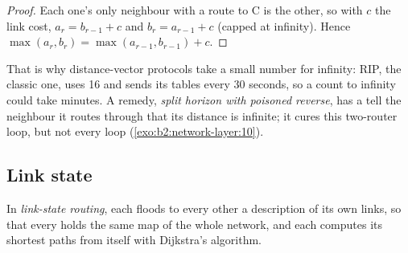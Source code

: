 \begin{proof}
Each one's only neighbour with a route to C is the other, so with $c$ the link cost, $a_{r} = b_{r-1} + c$ and $b_r =
a_{r-1} + c$ (capped at infinity). Hence $\max(a_r, b_r) = \max(a_{r-1}, b_{r-1}) + c$.
\end{proof}

\begin{omfigure}
\par{}
\end{omfigure}

That is why distance-vector protocols take a small number for infinity: RIP, the classic one, uses 16 and sends its
tables every 30 seconds, so a count to infinity could take minutes. A remedy, \emph{split horizon with poisoned
reverse}, has a  tell the neighbour it routes through that its distance is infinite; it cures this two-router
loop, but not every loop (\cref{exo:b2:network-layer:10}).

\subsection{Link state}

\begin{definition}\label{def:b2:network-layer:ls}
In \emph{link-state routing}, each  floods to every other  a description of its
own links, so that every  holds the same map of the whole network, and each computes its shortest paths from
itself with Dijkstra's algorithm.
\end{definition}

